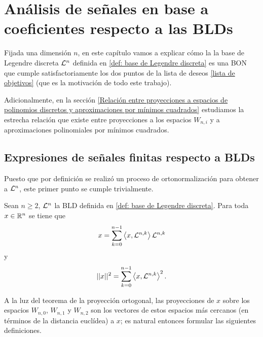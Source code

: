 \chapter{Análisis de señales en base a coeficientes respecto a las BLDs}
\label{chap: Analisis de señales en base a coeficientes respecto a las BLDs}
Fijada una dimensión $n$, 
en este capítulo vamos a explicar cómo la 
la base de Legendre discreta $\mathcal{L}^{n}$ definida en 
\ref{def: base de Legendre discreta}
es una BON que cumple satisfactoriamente los dos puntos de
la lista de deseos
\ref{lista de objetivos}
(que es la motivación de todo este trabajo).



Adicionalmente, en la sección 
\ref{Relación entre proyecciones a espacios de polinomios discretos y aproximaciones por mínimos cuadrados}
estudiamos la estrecha relación que existe entre
proyecciones a los espacios $W_{n,i}$ y a aproximaciones
polinomiales por mínimos cuadrados.


\section{Expresiones de señales finitas respecto a BLDs}


Puesto que por definición se realizó un proceso de ortonormalización
para obtener a $\mathcal{L}^{n}$, este primer punto se cumple trivialmente.

\begin{obs}
\label{obs: norma x bld}
Sean $n \geq 2$, $\mathcal{L}^{n}$ la BLD definida en 
\ref{def: base de Legendre discreta}.
Para toda $x \in \mathbb{R}^{n}$ se tiene que 
\[
x = \sum\limits_{k=0}^{n-1}\left\langle x, \mathcal{L}^{n,k} \right\rangle 
\mathcal{L}^{n,k}
\]
y
\[
|| x ||^{2} = \sum\limits_{k=0}^{n-1}\left\langle x, \mathcal{L}^{n,k} \right\rangle^{2}.
\]
\end{obs}

\noindent A la luz del teorema de la proyección ortogonal, 
las proyecciones de $x$ sobre los espacios 
$W_{n,0}$, $W_{n,1}$
y $W_{n,2}$ son los vectores
de estos espacios más cercanos (en términos de la 
distancia euclídea)
a $x$; es natural entonces formular
las siguientes definiciones.



